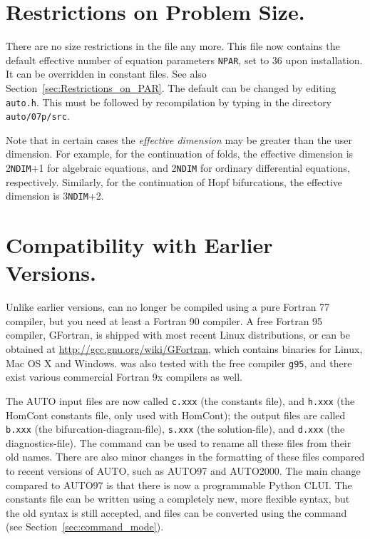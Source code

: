 \documentclass[12pt]{report}
\begin{document}
\section{ Restrictions on Problem Size.} \label{sec:Restrictions}
There are no size restrictions in the file  any more. This file now contains the
default effective number of equation parameters {\tt NPAR}, set to 36
upon installation. It can be overridden in constant files.
See also Section~\ref{sec:Restrictions_on_PAR}.
The default can be changed by editing {\tt auto.h}.
This must be followed by recompilation by typing  
in the directory {\tt auto/07p/src}.

Note that in certain cases the {\it effective dimension} may be greater
than the user dimension.
For example, for the continuation of folds,
the effective dimension is 2{\tt NDIM}+1 for algebraic equations,
and 2{\tt NDIM} for ordinary differential equations, respectively.
Similarly, for the continuation of Hopf bifurcations,
the effective dimension is 3{\tt NDIM}+2.
 
 
\section{ Compatibility with Earlier Versions.} \label{sec:Compatibility}
Unlike earlier versions, \AUTO can no longer be compiled using a pure
Fortran 77 compiler, but you need at least a Fortran 90 compiler.
A free Fortran 95 compiler, GFortran, is shipped with most recent
Linux distributions, or can be obtained at
\url{http://gcc.gnu.org/wiki/GFortran}, which contains binaries for
Linux, Mac OS X and Windows. \AUTO was also tested with the free
compiler {\tt g95}, and there exist various commercial Fortran
9x compilers as well.

The {\cal AUTO} input files are now called 
{\tt c.xxx} (the constants file),
and
{\tt h.xxx} (the {\cal HomCont} constants file, only used with {\cal HomCont});
the output files are called
{\tt b.xxx} (the bifurcation-diagram-file),
{\tt s.xxx} (the solution-file),
and
{\tt d.xxx} (the diagnostics-file).
The command  can be used to rename all these files from
their old names.
There are also minor changes in the formatting of these files 
compared to recent versions of {\cal AUTO}, such as {\cal AUTO97} 
and {\cal AUTO2000}.
The main change compared to {\cal AUTO97} is that there is now a
programmable Python CLUI. The constants file can be written using
a completely new, more flexible syntax, but the old syntax is
still accepted, and files can be converted using the command
 (see Section~\ref{sec:command_mode}).
\end{document}
